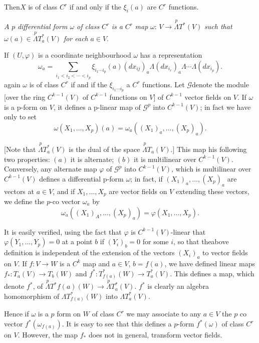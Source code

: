Then\pageoriginale $X$ is of class $C^r$ if and only if the $\xi_i (a)$ are $C^r$ functions.
\begin{defi*}
  $A$ $p$ {\em differential form $\omega$ of class } $C^r$ {\em is a
  } $C^r$ {\em map} $\omega$: $V \to \overset{p}\Lambda T^*(V)$ {\em
    such that} $\omega (a) \in   \overset{p}\Lambda T^*_a (V)$ {\em
    for each } $a \in V$. 
\end{defi*}
    
If $(U, \varphi)$ is a coordinate neighbourhood $\omega$ has a representation
$$
\omega_a = \sum_{i_1 < i_2 <\cdots < i_p} \xi_{i_1\cdots i_p} (a)
(dx_{ij})_a \Lambda(dx_{i_{r}})_a \Lambda \cdots \Lambda (dx_{i_p}). 
$$ 
again  $\omega$ is of class $C^r$ if and if the $\xi_{i_1\cdots i_p}$
a $C^r$ functions. Let $\mathscr{G}$denote the module [over the ring
  $C^{k-1}(V)$ of $C^{k-1}$ functions on $V$] of $C^{k-1}$ vector
fields on $V$. If $\omega$ is a p-form on $V$, it defines a p-linear
map of $\mathscr{G}^p$ into $C^{k-1}(V)$; in fact we have only to set 
$$
\omega(X_1, \ldots , X_p) (a) = \omega_a ((X_1)_a , \ldots , (X_p)_a).
$$

[Note that $\overset{p}\Lambda T^*_a (V)$ is the dual of the space
  $\overset{p}\Lambda T_a (V)$.] This map his following two
properties: $(a)$ it is alternate; $(b)$ it is multilinear over
$C^{k-1}(V)$. Conversely, any alternate map $\varphi$ of
$\mathscr{G}^p$ into $C^{k-1}(V)$, which is multilinear over
$C^{k-1}(V)$ defines a differential p-form $\omega$; in  fact, if
$(X_1)_a , \ldots , (X_p)_a$ are vectors at $a \in V$, and if $X_1 ,
\ldots , X_p$ are vector fields on $V$ extending these  vectors, we
define the $p$-co vector $\omega_a$ by  
$$
\omega_a ((X_1)_A , \ldots , (X_p)_a) = \varphi (X_1, \ldots , X_p).
$$

It is easily verified, using the fact that $\varphi$ is
$C^{k-1}(V)$-linear that $\varphi (Y_1, \ldots , Y_p)= 0$ at a point
$b$ if $(Y_i)_b=0$ for some $i$, so that  the\pageoriginale above definition is
independent  of the extension of the vectors $(X_i)_a$ to vector
fields on $V$. If $f: V \to W$ is a $C^k$ map and  $a \in V$, $b = f
(a)$, we have defined linear maps $f_*: T_a (V) \to T_b(W)$ and
$f^*: T^*_{f(a)}(W) \to T^*_a(V)$. This defines a map, which denote
$f^*$, of $\overset{p}\Lambda T^*{f(a)}(W) \to \overset{p}\Lambda
T^*_{a}(V)$. $f^*$ is clearly an algebra homomorphism of $\Lambda
T^*_{f(a)} (W)$ into $\Lambda T^*_{a} (V)$.  
    
Hence if $\omega$ is  a $p$ form on $W$ of class $C^r$ we may
associate to any $ a \in V$ the $p$ co vector $f^* (\omega_{f(a)})$. It
is easy to see that this defines a $p$-form $f^*(\omega)$ of class
$C^r$ on $V$. However, the map $f_*$ does not in general, transform
vector fields. 

